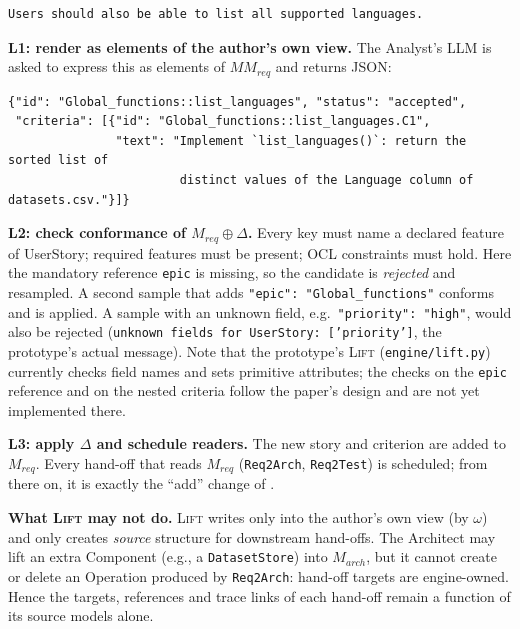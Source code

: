 \documentclass[10pt,a4paper]{article}
\newcommand{\MM}{\mathit{MM}}
\newcommand{\cls}[1]{\textsf{#1}}
\newcommand{\code}[1]{\texttt{#1}}
\newcommand{\file}[1]{\texttt{#1}}
\theoremstyle{definition}
\newcommand{\what}[1]{\par\smallskip\noindent\textbf{#1}\quad}
\begin{document}
\begin{lstlisting}[style=raw]
Users should also be able to list all supported languages.
\end{lstlisting}

\what{L1: render as elements of the author's own view.} The Analyst's LLM is
asked to express this as elements of $\MM_{\mathit{req}}$ and returns JSON:

\begin{lstlisting}[style=llm]
{"id": "Global_functions::list_languages", "status": "accepted",
 "criteria": [{"id": "Global_functions::list_languages.C1",
               "text": "Implement `list_languages()`: return the sorted list of
                        distinct values of the Language column of datasets.csv."}]}
\end{lstlisting}

\what{L2: check conformance of $M_{\mathit{req}}\oplus\Delta$.} Every key
must name a declared feature of \cls{UserStory}; required features must be
present; OCL constraints must hold. Here the mandatory reference \code{epic}
is missing, so the candidate is \emph{rejected} and resampled. A second sample
that adds \code{"epic": "Global_functions"} conforms and is applied. A sample
with an unknown field, e.g.\ \code{"priority": "high"}, would also be
rejected (\code{unknown fields for UserStory: ['priority']}, the prototype's
actual message). Note that the prototype's \textsc{Lift}
(\file{engine/lift.py}) currently checks field names and sets primitive
attributes; the checks on the \code{epic} reference and on the nested
criteria follow the paper's design and are not yet implemented there.

\what{L3: apply $\Delta$ and schedule readers.} The new story and criterion
are added to $M_{\mathit{req}}$. Every hand-off that reads $M_{\mathit{req}}$
(\code{Req2Arch}, \code{Req2Test}) is scheduled; from there on, it is exactly
the ``add'' change of .

\what{What \textsc{Lift} may not do.} \textsc{Lift} writes only into the
author's own view (by $\omega$) and only creates \emph{source} structure for
downstream hand-offs. The Architect may lift an extra \cls{Component} (e.g.,
a \code{DatasetStore}) into $M_{\mathit{arch}}$, but it cannot create or
delete an \cls{Operation} produced by \code{Req2Arch}: hand-off targets are
engine-owned. Hence the targets, references and trace links of each hand-off
remain a function of its source models alone.

\end{document}
